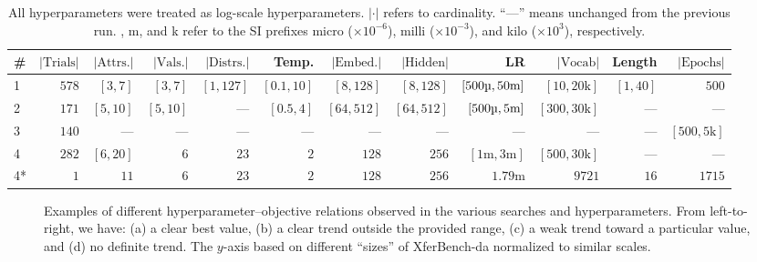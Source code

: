 \begin{table*}
  \newcommand\dit{---}
  \centering
  \footnotesize
  \setlength\tabcolsep{0.27em}
  \begin{tabular}{lrrrrrrrrrrr}
    \toprule
    \# & $|\text{Trials}|$ & $|\text{Attrs.}|$ & $|\text{Vals.}|$ & $|\text{Distrs.}|$ & Temp. & $|\text{Embed.}|$ & $|\text{Hidden}|$ & LR & $|\text{Vocab}|$ & Length & $|\text{Epochs}|$ \\
    \midrule
    1  & $578$ & $[3,7]$  &  $[3,7]$ & $[1,127]$ & $[0.1, 10]$ & $[8,128]$  & $[8,128]$  & $[500\text{\textmu},50\text{m}]$ & $[10,20\text{k}]$  & $[1,40]$ & $500$             \\
    2  & $171$ & $[5,10]$ & $[5,10]$ & \dit{}    &  $[0.5, 4]$ & $[64,512]$ & $[64,512]$ & $[500\text{\textmu},5\text{m}]$  & $[300,30\text{k}]$ & \dit{}   & \dit{}            \\
    3  & $140$ & \dit{}   & \dit{}   & \dit{}    & \dit{}      & \dit{}     & \dit{}     & \dit{}                           & \dit{}             & \dit{}   & $[500,5\text{k}]$ \\
    4  & $282$ & $[6,20]$ &    $6$   & $23$      & $2$         & $128$      & $256$      & $[1\text{m},3\text{m}]$          & $[500,30\text{k}]$ & \dit{}   & \dit{}            \\
    4* &   $1$ & $11$     &    $6$   & $23$      & $2$         & $128$      & $256$      & $1.79\text{m}$                           & $9721$            & $16$     & $1715$            \\
    \bottomrule
  \end{tabular}
  \caption{All hyperparameters were treated as log-scale hyperparameters. $|{\cdot}|$ refers to cardinality. ``\dit{}'' means unchanged from the previous run. \textmu, m, and k refer to the SI prefixes micro ($\times10^{-6}$), milli ($\times10^{-3}$), and kilo ($\times10^{3}$), respectively.}
  \unskip\label{tab:hp-search}
\end{table*}

\begin{figure*}
  \centering
  \caption{Examples of different hyperparameter--objective relations observed in the various searches and hyperparameters.
    From left-to-right, we have:
      (a) a clear best value,
      (b) a clear trend outside the provided range,
      (c) a weak trend toward a particular value,
      and (d) no definite trend.
    The $y$-axis based on different ``sizes'' of XferBench-da normalized to similar scales.}
  \unskip\label{hpo:fig:hpo-slice}
\end{figure*}

